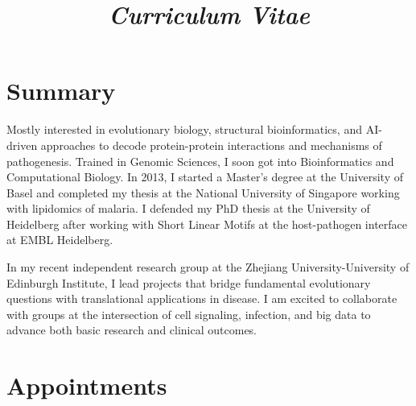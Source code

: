\documentclass[11pt,a4paper,sans]{moderncv} %
\title{\emph{Curriculum Vitae}}
\begin{document}
\makecvtitle %
\vspace{-0.8cm}
\section{Summary}
Mostly interested in evolutionary biology, structural bioinformatics, and AI-driven approaches to decode protein-protein interactions and mechanisms of pathogenesis. Trained in Genomic Sciences, I soon got into Bioinformatics and Computational Biology. In 2013, I started a Master's degree at the University of Basel and completed my thesis at the National University of Singapore working with lipidomics of malaria. I defended my PhD thesis at the University of Heidelberg after working with Short Linear Motifs at the host-pathogen interface at EMBL Heidelberg. 

In my recent independent research group at the Zhejiang University-University of Edinburgh Institute, I lead projects that bridge fundamental evolutionary questions with translational applications in disease. I am excited to collaborate with groups at the intersection of cell signaling, infection, and big data to advance both basic research and clinical outcomes.

\vspace{0.5cm}

\section{Appointments}
\vspace{0.1cm}
\vspace{0.1cm}
\vspace{0.1cm}
\vspace{0.1cm}
\end{document}
